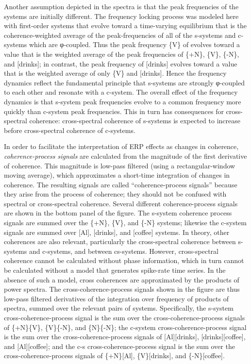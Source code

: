 Another assumption depicted in the spectra is that the peak frequencies of the systems are initially different. The frequency locking process was modeled here with first-order systems that evolve toward a time-varying equilibrium that is the coherence-weighted average of the peak-frequencies of all of the s-systems and c-systems which are φ-coupled. Thus the peak frequency \{V\} of evolves toward a value that is the weighted average of the peak frequencies of \{+N\}, \{V\}, \{-N\}, and [drinks]; in contrast, the peak frequency of [drinks] evolves toward a value that is the weighted average of only \{V\} and [drinks]. Hence the frequency dynamics reflect the fundamental principle that s-systems are strongly φ-coupled to each other and resonate with a c-system. The overall effect of the frequency dynamics is that s-system peak frequencies evolve to a common frequency more quickly than c-system peak frequencies. This in turn has consequences for cross-spectral coherence: cross-spectral coherence of s-systems is expected to increase before cross-spectral coherence of c-systems.

  In order to facilitate the interpretation of ERP effects as changes in coherence, \textit{coherence-process signals} are calculated from the magnitude of the first derivative of coherence. This magnitude is low-pass filtered (using a rectangular-window moving average), which approximates a short-time integration of changes in coherence. The resulting signals are called “coherence-process signals” because they arise from the process of coherence; they should not be confused with spectral or cross-spectral coherence. Several different coherence-process signals are shown in the bottom panel of the figure. The s-system coherence process signals are summed over the \{+N\}, \{V\}, and \{-N\} systems; likewise the c-system signals are summed over [Al], [drinks], and [coffee] systems. In theory, other coherences are also relevant, particularly the cross-spectral coherence between s-systems and c-systems, and between cs-systems. However, cross-spectral coherence cannot be calculated without phase information, which in turn cannot be calculated without a model that generates spike-rate time series. In the absence of such a model, cross coherences are approximated by the products of power spectra. The cross-coherence-process signals shown in the figure are thus low-pass filtered derivatives of the integration over frequency of products of spectra, summed over the relevant pairs of systems. Specifically, the s-system cross-coherence-process signal is the sum over the cross-coherence-process signals of \{+N\}\{V\}, \{V\}\{-N\}, and \{N\}\{-N\}; the c-system cross-coherence-process signal is the sum over the cross-coherence-process signals of [Al][drinks], [drinks][coffee], and [Al][coffee]; and the c-s cross-coherence-process signal is the sum over the cross-coherence-process signals of \{+N\}[Al], \{V\}[drinks], and \{-N\}[coffee]. 

